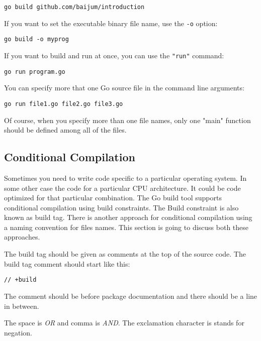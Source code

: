 \begin{lstlisting}[numbers=none]
go build github.com/baijum/introduction
\end{lstlisting}

If you want to set the executable binary file name, use
the \texttt{-o} option:

\begin{lstlisting}[numbers=none]
go build -o myprog
\end{lstlisting}

If you want to build and run at once, you can use the \texttt{"run"}
command:

\begin{lstlisting}[numbers=none]
go run program.go
\end{lstlisting}

You can specify more that one Go source file in the command line
arguments:

\begin{lstlisting}[numbers=none]
go run file1.go file2.go file3.go
\end{lstlisting}

Of course, when you specify more than one file names, only one "main"
function should be defined among all of the files.

\subsection{Conditional Compilation}

Sometimes you need to write code specific to a particular operating
system.  In some other case the code for a particular CPU
architecture.  It could be code optimized for that particular
combination.  The Go build tool supports conditional compilation using
build constraints.  The Build constraint is also known as build tag.
There is another approach for conditional compilation using a naming
convention for files names.  This section is going to discuss both
these approaches.

The build tag should be given as comments at the top of the source
code.  The build tag comment should start like this:

\begin{lstlisting}[numbers=none]
// +build
\end{lstlisting}

The comment should be before package documentation and there should be
a line in between.

The space is \textit{OR} and comma is \textit{AND}.  The exclamation
character is stands for negation.

